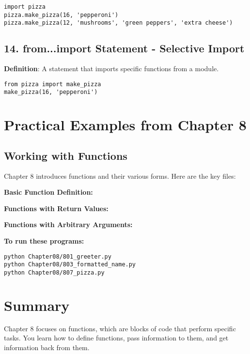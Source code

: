 \begin{lstlisting}
import pizza
pizza.make_pizza(16, 'pepperoni')
pizza.make_pizza(12, 'mushrooms', 'green peppers', 'extra cheese')
\end{lstlisting}

\subsection*{14. from...import Statement - Selective Import}
\textbf{Definition}: A statement that imports specific functions from a module.

\begin{lstlisting}
from pizza import make_pizza
make_pizza(16, 'pepperoni')
\end{lstlisting}

\section*{Practical Examples from Chapter 8}

\subsection*{Working with Functions}
Chapter 8 introduces functions and their various forms. Here are the key files:

\textbf{Basic Function Definition:}


\textbf{Functions with Return Values:}


\textbf{Functions with Arbitrary Arguments:}


\textbf{To run these programs:}
\begin{verbatim}
python Chapter08/801_greeter.py
python Chapter08/803_formatted_name.py
python Chapter08/807_pizza.py
\end{verbatim}

\section*{Summary}
Chapter 8 focuses on functions, which are blocks of code that perform specific tasks. You learn how to define functions, pass information to them, and get information back from them.

